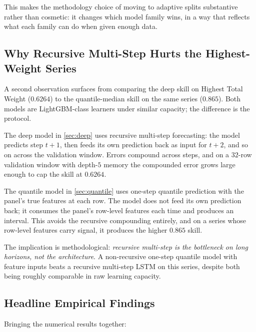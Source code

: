 This makes the methodology choice of moving to adaptive splits substantive rather than cosmetic: it changes which model family wins, in a way that reflects what each family can do when given enough data.

\subsection{Why Recursive Multi-Step Hurts the Highest-Weight Series}
\label{sec:analysis:recursion}

A second observation surfaces from comparing the deep skill on Highest Total Weight ($0.6264$) to the quantile-median skill on the same series ($0.865$). Both models are LightGBM-class learners under similar capacity; the difference is the protocol.

The deep model in \cref{sec:deep} uses recursive multi-step forecasting: the model predicts step $t+1$, then feeds its own prediction back as input for $t+2$, and so on across the validation window. Errors compound across steps, and on a $32$-row validation window with depth-$5$ memory the compounded error grows large enough to cap the skill at $0.6264$.

The quantile model in \cref{sec:quantile} uses one-step quantile prediction with the panel's true features at each row. The model does not feed its own prediction back; it consumes the panel's row-level features each time and produces an interval. This avoids the recursive compounding entirely, and on a series whose row-level features carry signal, it produces the higher $0.865$ skill.

The implication is methodological: \emph{recursive multi-step is the bottleneck on long horizons, not the architecture}. A non-recursive one-step quantile model with feature inputs beats a recursive multi-step LSTM on this series, despite both being roughly comparable in raw learning capacity.

\subsection{Headline Empirical Findings}
\label{sec:analysis:headline}

Bringing the numerical results together:

